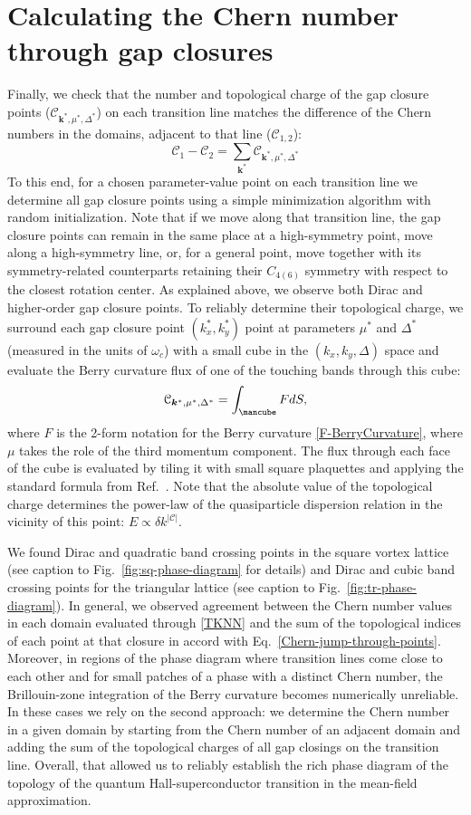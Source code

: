\documentclass[10pt,prb,aps,superscriptaddress,amsmath,amssymb,twocolumn,floatfix,longbibliography]{revtex4-1}
\newcommand{\be}{\begin{equation} }
\newcommand{\ee}{\end{equation}}
\begin{document}
\section{Calculating the Chern number through gap closures}
\label{subsec:jump-matching}
Finally, we check that the number and topological charge of the gap closure points ($\mathcal{C}_{\bm{k}^*,\mu^*,\Delta^*}$) on each transition line matches the difference of the Chern numbers in the domains, adjacent to that line ($\mathcal{C}_{1,2}$):
\be \label{Chern-jump-through-points}
    \mathcal{C}_{1} - \mathcal{C}_{2} = \sum_{\bm{k}^*} \mathcal{C}_{\bm{k}^*,\mu^*,\Delta^*}
\ee
To this end, for a chosen parameter-value point on each transition line we determine all gap closure points using a simple minimization algorithm with random initialization. Note that if we move along that transition line, the gap closure points can remain in the same place at a high-symmetry point, move along a high-symmetry line, or, for a general point, move together with its symmetry-related counterparts retaining their $C_{4(6)}$ symmetry with respect to the closest rotation center. As explained above, we observe both Dirac and higher-order gap closure points. To reliably determine their topological charge, we surround each gap closure point $(k_x^*, k_y^*)$ point at parameters $\mu^*$ and $\Delta^*$ (measured in the units of $\omega_c$) with a small cube in the $(k_x, k_y, \Delta)$ space and evaluate the Berry curvature flux of one of the touching bands through this cube:
\be
    \mathcal{C}_{\bm{k}^*,\mu^*,\Delta^*} = \int_{\text{\mancube}} F dS,
\ee
where $F$ is the 2-form notation for the Berry curvature \eqref{F-BerryCurvature}, where $\mu$ takes the role of the third momentum component. The flux through each face of the cube is evaluated by tiling it with small square plaquettes and applying the standard formula from Ref.~. Note that the absolute value of the topological charge determines the power-law of the quasiparticle dispersion relation in the vicinity of this point: $E\propto \delta k^{|\mathcal{C}|}$.

We found Dirac and quadratic band crossing points in the square vortex lattice (see caption to Fig.~\ref{fig:sq-phase-diagram} for details) and Dirac and cubic band crossing points for the triangular lattice (see caption to Fig.~\ref{fig:tr-phase-diagram}). In general, we observed agreement between the Chern number values in each domain evaluated through \eqref{TKNN} and the sum of the topological indices of each point at that closure in accord with Eq.~\eqref{Chern-jump-through-points}. Moreover, in regions of the phase diagram where transition lines come close to each other and for small patches of a phase with a distinct Chern number, the Brillouin-zone integration of the Berry curvature becomes numerically unreliable. In these cases we rely on the second approach: we determine the Chern number in a given domain by starting from the Chern number of an adjacent domain and adding the sum of the topological charges of all gap closings on the transition line.
Overall, that allowed us to reliably establish the rich phase diagram of the topology of the quantum Hall-superconductor transition in the mean-field approximation. 
\end{document}
